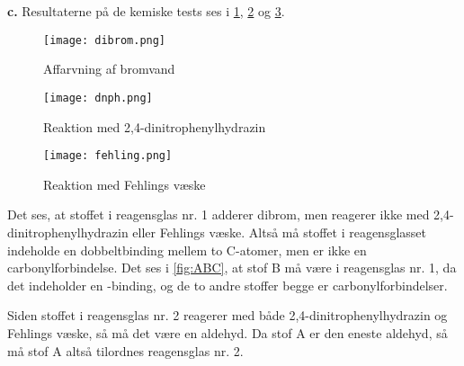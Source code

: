 \documentclass{report}
\begin{document}
\textbf{c.}
Resultaterne på de kemiske tests ses i \cref{fig:dibrom}, \cref{fig:dnph} og \cref{fig:fehling}.
\begin{multicols}{3}
\begin{figure}[H]
\begin{center}
  \texttt{[image: dibrom.png]}
\end{center}
\caption{Affarvning af bromvand}
\label{fig:dibrom}
\end{figure}
\begin{figure}[H]
\begin{center}
  \texttt{[image: dnph.png]}
\end{center}
\caption{Reaktion med 2,4-dinitrophenylhydrazin}
\label{fig:dnph}
\end{figure}
\begin{figure}[H]
\begin{center}
  \texttt{[image: fehling.png]}
\end{center}
\caption{Reaktion med Fehlings væske}
\label{fig:fehling}
\end{figure}
\end{multicols}
Det ses, at stoffet i reagensglas nr. 1 adderer dibrom, men reagerer ikke med 2,4-dinitrophenylhydrazin eller Fehlings væske.
Altså må stoffet i reagensglasset indeholde en dobbeltbinding mellem to C-atomer, men er ikke en carbonylforbindelse.
Det ses i \cref{fig:ABC}, at stof B må være i reagensglas nr. 1, da det indeholder en -binding, og de to andre stoffer begge er carbonylforbindelser.

Siden stoffet i reagensglas nr. 2 reagerer med både 2,4-dinitrophenylhydrazin og Fehlings væske, så må det være en aldehyd.
Da stof A er den eneste aldehyd, så må stof A altså tilordnes reagensglas nr. 2.
\end{document}
